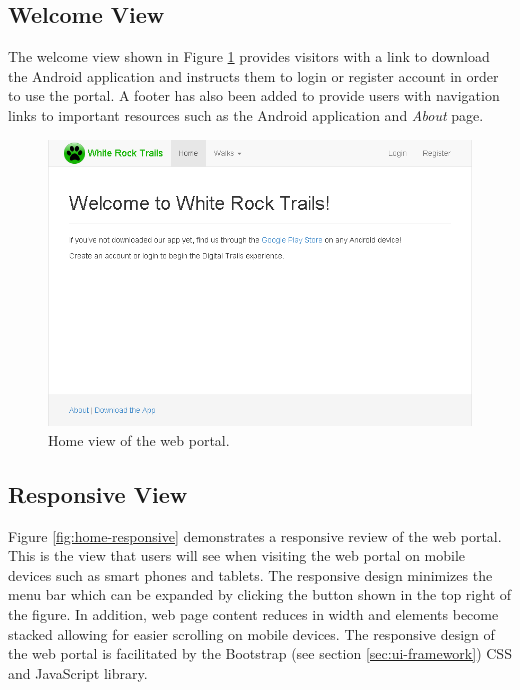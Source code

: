 \documentclass[11pt,a4paper]{article}
\begin{document}
\subsection{Welcome View}

The welcome view shown in Figure \ref{fig:home} provides visitors with a link to download the Android application and instructs them to login or register account in order to use the portal. A footer has also been added to provide users with navigation links to important resources such as the Android application and \emph{About} page.

\begin{figure}[H]
\centering
\includegraphics[width=0.8\linewidth]{./img/webportal/home}
\caption{Home view of the web portal.}
\label{fig:home}
\end{figure}

\subsection{Responsive View}

Figure \ref{fig:home-responsive} demonstrates a responsive review of the web portal. This is the view that users will see when visiting the web portal on mobile devices such as smart phones and tablets. The responsive design minimizes the menu bar which can be expanded by clicking the button shown in the top right of the figure. In addition, web page content reduces in width and elements become stacked allowing for easier scrolling on mobile devices. The responsive design of the web portal is facilitated by the Bootstrap (see section \ref{sec:ui-framework}) CSS and JavaScript library.
\end{document}
